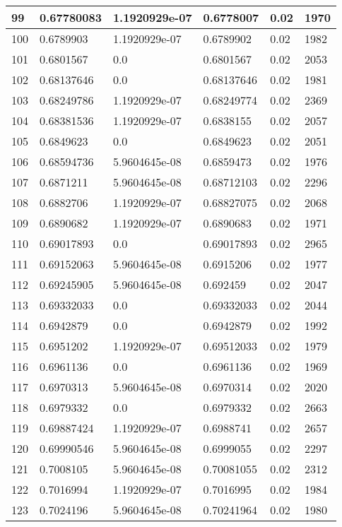 \begin{longtable}{|l|l|l|l|l|l|}
99 & 0.67780083 & 1.1920929e-07 & 0.6778007 & 0.02 & 1970 \\ \hline 
100 & 0.6789903 & 1.1920929e-07 & 0.6789902 & 0.02 & 1982 \\ \hline 
101 & 0.6801567 & 0.0 & 0.6801567 & 0.02 & 2053 \\ \hline 
102 & 0.68137646 & 0.0 & 0.68137646 & 0.02 & 1981 \\ \hline 
103 & 0.68249786 & 1.1920929e-07 & 0.68249774 & 0.02 & 2369 \\ \hline 
104 & 0.68381536 & 1.1920929e-07 & 0.6838155 & 0.02 & 2057 \\ \hline 
105 & 0.6849623 & 0.0 & 0.6849623 & 0.02 & 2051 \\ \hline 
106 & 0.68594736 & 5.9604645e-08 & 0.6859473 & 0.02 & 1976 \\ \hline 
107 & 0.6871211 & 5.9604645e-08 & 0.68712103 & 0.02 & 2296 \\ \hline 
108 & 0.6882706 & 1.1920929e-07 & 0.68827075 & 0.02 & 2068 \\ \hline 
109 & 0.6890682 & 1.1920929e-07 & 0.6890683 & 0.02 & 1971 \\ \hline 
110 & 0.69017893 & 0.0 & 0.69017893 & 0.02 & 2965 \\ \hline 
111 & 0.69152063 & 5.9604645e-08 & 0.6915206 & 0.02 & 1977 \\ \hline 
112 & 0.69245905 & 5.9604645e-08 & 0.692459 & 0.02 & 2047 \\ \hline 
113 & 0.69332033 & 0.0 & 0.69332033 & 0.02 & 2044 \\ \hline 
114 & 0.6942879 & 0.0 & 0.6942879 & 0.02 & 1992 \\ \hline 
115 & 0.6951202 & 1.1920929e-07 & 0.69512033 & 0.02 & 1979 \\ \hline 
116 & 0.6961136 & 0.0 & 0.6961136 & 0.02 & 1969 \\ \hline 
117 & 0.6970313 & 5.9604645e-08 & 0.6970314 & 0.02 & 2020 \\ \hline 
118 & 0.6979332 & 0.0 & 0.6979332 & 0.02 & 2663 \\ \hline 
119 & 0.69887424 & 1.1920929e-07 & 0.6988741 & 0.02 & 2657 \\ \hline 
120 & 0.69990546 & 5.9604645e-08 & 0.6999055 & 0.02 & 2297 \\ \hline 
121 & 0.7008105 & 5.9604645e-08 & 0.70081055 & 0.02 & 2312 \\ \hline 
122 & 0.7016994 & 1.1920929e-07 & 0.7016995 & 0.02 & 1984 \\ \hline 
123 & 0.7024196 & 5.9604645e-08 & 0.70241964 & 0.02 & 1980 \\ \hline 

\end{longtable}
